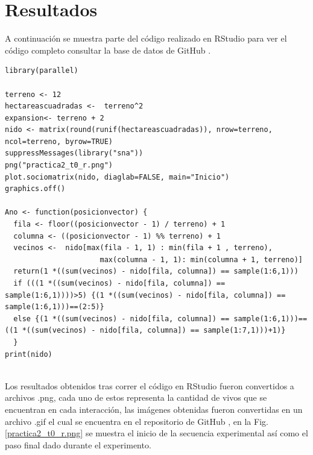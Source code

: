 \documentclass[a4paper]{article}
\begin{document}
\section{Resultados}
\justify A continuación se muestra parte del código realizado en RStudio \cite{RStudio}  para ver el código completo consultar la base de datos de GitHub \cite{p2Git}.
\\
\begin{lstlisting}
library(parallel)

terreno <- 12  
hectareascuadradas <-  terreno^2
expansion<- terreno + 2
nido <- matrix(round(runif(hectareascuadradas)), nrow=terreno, ncol=terreno, byrow=TRUE)
suppressMessages(library("sna")) 
png("practica2_t0_r.png")
plot.sociomatrix(nido, diaglab=FALSE, main="Inicio")
graphics.off()

Ano <- function(posicionvector) {
  fila <- floor((posicionvector - 1) / terreno) + 1
  columna <- ((posicionvector - 1) %% terreno) + 1
  vecinos <-  nido[max(fila - 1, 1) : min(fila + 1 , terreno),
                      max(columna - 1, 1): min(columna + 1, terreno)]
  return(1 *((sum(vecinos) - nido[fila, columna]) == sample(1:6,1)))
  if (((1 *((sum(vecinos) - nido[fila, columna]) == sample(1:6,1))))>5) {(1 *((sum(vecinos) - nido[fila, columna]) == sample(1:6,1)))==(2:5)}
  else {(1 *((sum(vecinos) - nido[fila, columna]) == sample(1:6,1)))==((1 *((sum(vecinos) - nido[fila, columna]) == sample(1:7,1)))+1)}
  }
print(nido)

\end{lstlisting}
\\
\justify Los resultados obtenidos tras correr el código en RStudio \cite{RStudio} fueron convertidos a archivos .png, cada uno de estos representa la cantidad de vivos que se encuentran en cada interacción, las imágenes obtenidas fueron convertidas en un archivo .gif \cite{gif} el cual se encuentra en el repositorio de GitHub \cite{gitadrian}, en la Fig. \ref{practica2_t0_r.png} se muestra el inicio de la secuencia experimental así como el paso final dado durante el experimento.
\\
\end{document}
